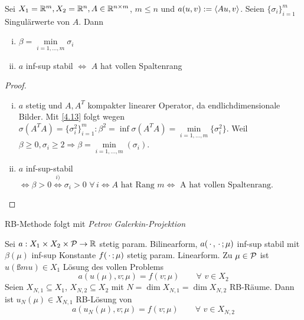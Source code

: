 \begin{kor}
Sei $X_1 = \mathbb{R}^m, X_2 = \mathbb{R}^n, A \in \mathbb{R}^{n \times m}$, $m \leq n$ und $a(u,v) := \langle Au, v \rangle$. Seien $\{\sigma_i\}_{i=1}^m$ Singulärwerte von $A$. Dann
\begin{enumerate}[i)]
	\item $\beta = \min\limits_{i=1,\dots,m} \sigma_i$
	\item $a$ inf-sup stabil $\iff$ $A$ hat vollen Spaltenrang
\end{enumerate}
\begin{proof}
\begin{enumerate}[i)]
	\item $a$ stetig und $A, A^T$ kompakter linearer Operator, da endlichdimensionale  Bilder. Mit \ref{4.13} folgt wegen $\sigma(A^TA) = \{\sigma_i^2\}_{i=1}^m : \beta^2 = \inf \sigma(A^TA) = \min\limits_{i=1,\dots,m} \{\sigma_i^2\}$. Weil $\beta \geq 0, \sigma_i \geq 2 \Rightarrow \beta = \min\limits_{i=1,\dots,m} (\sigma_i)$.
	\item $a$ inf-sup-stabil $\iff \beta > 0 \overset{i)}{\iff} \sigma_i > 0 \,\, \forall \, i \iff A \text{ hat Rang } m \iff \text{ A hat vollen Spaltenrang.}$
\end{enumerate}
\end{proof}
\end{kor}

RB-Methode folgt mit \emph{Petrov Galerkin-Projektion}

\begin{defn} \label{4.15}
Sei $a: X_1 \times X_2 \times \mathcal{P} \rightarrow \mathbb{R}$ stetig param. Bilinearform, $a(\,\cdot\,,\,\cdot\,;\mu)$ inf-sup stabil mit $\beta(\mu)$ inf-sup Konstante $f(\,\cdot\,;\mu)$ stetig param. Linearform. Zu $\mu \in \mathcal{P}$ ist $u(ßmu) \in X_1$ Lösung des vollen Problems
\[
	a(u(\mu),v;\mu) = f(v;\mu) \qquad \forall \,\, v \in X_2
\]
Seien $X_{N,1} \subseteq X_1$, $X_{N,2} \subseteq X_2$ mit $N = \dim X_{N,1} = \dim X_{N,2}$ RB-Räume. Dann ist $u_N (\mu) \in X_{N,1}$ RB-Lösung von
\[
	a(u_N(\mu),v;\mu) = f(v;\mu) \qquad \forall \,\, v \in X_{N,2}
\]
\end{defn}


